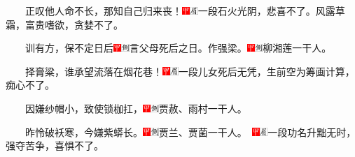 　　正叹他人命不长，那知自己归来丧！{\includegraphics[width=3mm]{../Images/00002}\includegraphics[width=3mm]{../Images/00010}\footnotesize  一段石火光阴，悲喜不了。风露草霜，富贵嗜欲，贪婪不了。}

　　训有方，保不定日后{\includegraphics[width=3mm]{../Images/00002}\includegraphics[width=3mm]{../Images/00011}\footnotesize 言父母死后之日。}作强梁。{\includegraphics[width=3mm]{../Images/00002}\includegraphics[width=3mm]{../Images/00011}\footnotesize 柳湘莲一干人。}

　　择膏粱，谁承望流落在烟花巷！{\includegraphics[width=3mm]{../Images/00002}\includegraphics[width=3mm]{../Images/00010}\footnotesize  一段儿女死后无凭，生前空为筹画计算，痴心不了。}

　　因嫌纱帽小，致使锁枷扛，{\includegraphics[width=3mm]{../Images/00002}\includegraphics[width=3mm]{../Images/00011}\footnotesize 贾赦、雨村一干人。}

　　昨怜破袄寒，今嫌紫蟒长。{\includegraphics[width=3mm]{../Images/00002}\includegraphics[width=3mm]{../Images/00011}\footnotesize 贾兰、贾菌一干人。　\includegraphics[width=3mm]{../Images/00002}\includegraphics[width=3mm]{../Images/00010}\footnotesize  一段功名升黜无时，强夺苦争，喜惧不了。}

